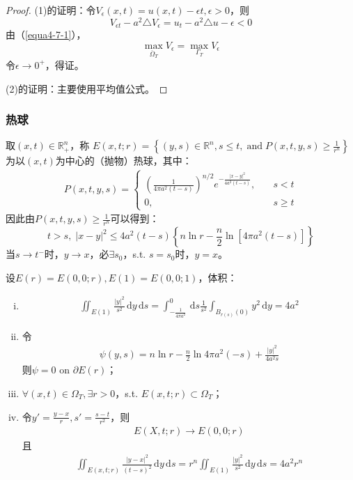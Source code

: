 \documentclass[11pt, a4paper]{article}
\theoremstyle{theorem}
\newcommand{\intd}[1]{\,\mathrm{d}{#1}}
\begin{document}
\begin{proof}
(1)的证明：令$V_\epsilon(x,t) = u(x,t) - \epsilon t, \epsilon > 0$，则
$$
V_{\epsilon t} - a^2 \triangle V_\epsilon = u_t - a^2 \triangle u - \epsilon < 0
$$
由（\ref{equa4-7-1}），
$$
\max\limits_{\overline{\Omega}_T} V_\epsilon = \max\limits_{\Gamma_T} V_\epsilon
$$
令$\epsilon \rightarrow 0^+$，得证。

(2)的证明：主要使用平均值公式。

\end{proof}

\subsubsection{热球}

取$(x,t) \in \mathbb{R}^n_+$，称 $E(x,t; r) = \left\{(y,s) \in \mathbb{R}^n, s \leq t, \; \text{and} \; P(x,t,y,s) \geq \frac{1}{r^n} \right\}$ 为以$(x,t)$为中心的（抛物）热球，其中：
\begin{align}
    P(x,t,y,s) =
    \begin{cases}
      \left(\frac{1}{4\pi a^2(t-s)}\right)^{n/2} e^{-\frac{|x - y|^2}{4a^2(t-s)}}, \quad &s < t \\
      0, \quad &s \geq t
    \end{cases}
\end{align}
因此由$P(x,t,y,s) \geq \frac{1}{r^n}$可以得到：
$$
t > s, \; |x - y|^2 \leq 4a^2(t-s) \left\{n \ln r - \frac{n}{2} \ln [4 \pi a^2(t-s)]\right\}
$$
当$s \rightarrow t^-$时，$y \rightarrow x$，必$\exists s_0$，s.t. $s = s_0$时，$y = x$。

设$E(r) = E(0,0; r), E(1) = E(0,0;1)$，体积：
\begin{enumerate}[(i)]
  \item
  \begin{align}
      \iint_{E(1)} \frac{|y|^2}{s^2} \intd y \intd s = \int_{-\frac{1}{4\pi a^2}}^0 \intd s \frac{1}{s^2} \int_{B_{r(s)}(0)} y^2 \intd y = 4a^2
  \end{align}
  \item 令
  \begin{align}
      \psi(y,s) = n \ln r - \frac{n}{2} \ln 4 \pi a^2(-s) + \frac{|y|^2}{4 a^2 s}
  \end{align}
  则$\psi = 0$ on $\partial E(r)$；
  \item $\forall (x,t) \in \Omega_T, \exists r > 0$，s.t. $E(x,t;r) \subset \Omega_T$；
  \item 令$y' = \frac{y - x}{r}, s' = \frac{s-t}{r^2}$，则
  \begin{align}
      E(X,t;r) \longrightarrow E(0,0;r)
  \end{align}
  且
  \begin{align}
      \iint_{E(x,t;r)} \frac{|y - x|^2}{(t-s)^2} \intd y \intd s = r^n \iint_{E(1)} \frac{|y|^2}{s^2} \intd y \intd s = 4a^2r^n
  \end{align}
\end{enumerate}
\end{document}
